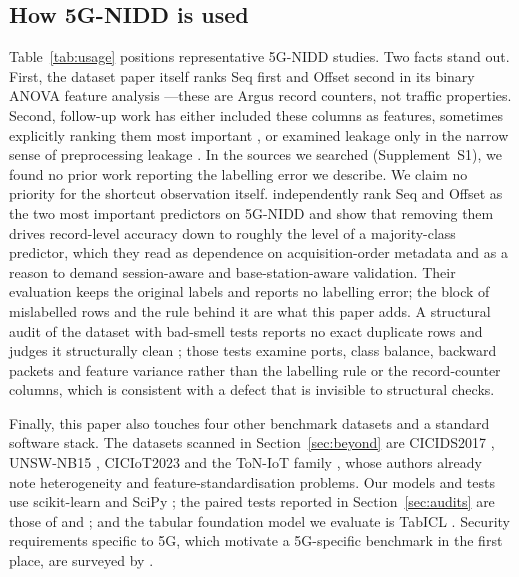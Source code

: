 \documentclass[preprint,12pt]{elsarticle}
\begin{document}
\subsection{How 5G-NIDD is used}
\label{sec:usage}

Table~\ref{tab:usage} positions representative 5G-NIDD studies. Two facts stand
out. First, the dataset paper itself ranks Seq first and Offset second in its
binary ANOVA feature analysis \citep{samarakoon2022_5gnidd}---these are Argus
record counters, not traffic properties. Second, follow-up work has either
included these columns as features, sometimes explicitly ranking them most
important \citep{uccello2026_featureattr, ilias2024_cnnmoe}, or examined
leakage only in the narrow sense of preprocessing leakage
\citep{bouke2024_leakagefree}. In the sources we searched (Supplement~S1), we found no prior work
reporting the labelling error we describe. We claim no priority for the
shortcut observation itself. \citet{abraheem2026_seqmeta} independently rank
Seq and Offset as the two most important predictors on 5G-NIDD and show that
removing them drives record-level accuracy down to roughly the level of a
majority-class predictor, which they read as dependence on acquisition-order
metadata and as a reason to demand session-aware and base-station-aware
validation. Their evaluation keeps the original labels and reports no
labelling error; the block of mislabelled rows and the rule behind it are
what this paper adds. A structural audit of the dataset
with bad-smell tests reports no exact duplicate rows and judges it
structurally clean \citep{khalil2026_swits}; those tests examine ports, class
balance, backward packets and feature variance rather than the labelling rule
or the record-counter columns, which is consistent with a defect that is
invisible to structural checks.

Finally, this paper also touches four other benchmark datasets and a standard
software stack. The datasets scanned in Section~\ref{sec:beyond} are CICIDS2017
\citep{sharafaldin2018_cicids2017}, UNSW-NB15 \citep{moustafa2015_unswnb15},
CICIoT2023 \citep{neto2023_ciciot2023} and the ToN-IoT family \citep{booij2022_toniot},
whose authors already note heterogeneity and feature-standardisation problems.
Our models and tests use scikit-learn \citep{pedregosa2011_sklearn} and SciPy
\citep{virtanen2020_scipy}; the paired tests reported in Section~\ref{sec:audits} are
those of \citet{wilcoxon1945_ranking} and \citet{mcnemar1947_sampling}; and the
tabular foundation model we evaluate is TabICL \citep{qu2025_tabicl}. Security
requirements specific to 5G, which motivate a 5G-specific benchmark in the
first place, are surveyed by \citet{ahmad2018_5gsecurity}.
\end{document}
